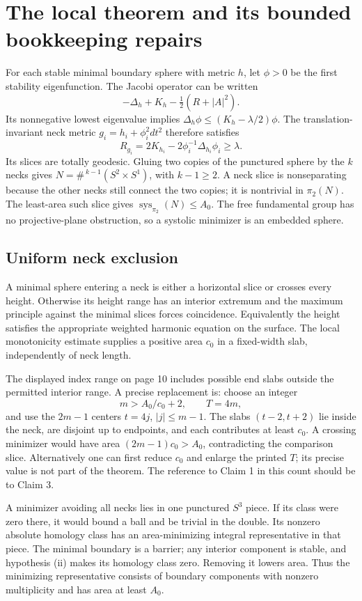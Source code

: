 \documentclass[10pt]{article}
\begin{document}
\section*{The local theorem and its bounded bookkeeping repairs}
For each stable minimal boundary sphere with metric \(h\), let \(\phi>0\) be the first stability eigenfunction. The Jacobi operator can be written \[-\Delta_h+K_h-\tfrac12(R+|A|^2).\] Its nonnegative lowest eigenvalue implies \(\Delta_h\phi\le(K_h-\lambda/2)\phi\). The translation-invariant neck metric \(g_i=h_i+\phi_i^2dt^2\) therefore satisfies \[R_{g_i}=2K_{h_i}-2\phi_i^{-1}\Delta_{h_i}\phi_i\ge\lambda.\] Its slices are totally geodesic. Gluing two copies of the punctured sphere by the \(k\) necks gives \(N=\#^{\,k-1}(S^2\times S^1)\), with \(k-1\ge2\). A neck slice is nonseparating because the other necks still connect the two copies; it is nontrivial in \(\pi_2(N)\). The least-area such slice gives \(\operatorname{sys}_{\pi_2}(N)\le A_0\). The free fundamental group has no projective-plane obstruction, so a systolic minimizer is an embedded sphere.\par
\subsection*{Uniform neck exclusion}
A minimal sphere entering a neck is either a horizontal slice or crosses every height. Otherwise its height range has an interior extremum and the maximum principle against the minimal slices forces coincidence. Equivalently the height satisfies the appropriate weighted harmonic equation on the surface. The local monotonicity estimate supplies a positive area \(c_0\) in a fixed-width slab, independently of neck length.\par
The displayed index range on page 10 includes possible end slabs outside the permitted interior range. A precise replacement is: choose an integer \[m>A_0/c_0+2,\qquad T=4m,\] and use the \(2m-1\) centers \(t=4j\), \(|j|\le m-1\). The slabs \((t-2,t+2)\) lie inside the neck, are disjoint up to endpoints, and each contributes at least \(c_0\). A crossing minimizer would have area \((2m-1)c_0>A_0\), contradicting the comparison slice. Alternatively one can first reduce \(c_0\) and enlarge the printed \(T\); its precise value is not part of the theorem. The reference to Claim 1 in this count should be to Claim 3.\par
A minimizer avoiding all necks lies in one punctured \(S^3\) piece. If its class were zero there, it would bound a ball and be trivial in the double. Its nonzero absolute homology class has an area-minimizing integral representative in that piece. The minimal boundary is a barrier; any interior component is stable, and hypothesis (ii) makes its homology class zero. Removing it lowers area. Thus the minimizing representative consists of boundary components with nonzero multiplicity and has area at least \(A_0\).\par
\end{document}
